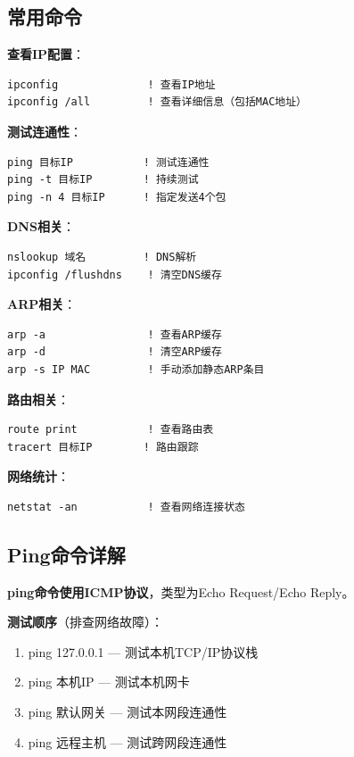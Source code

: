 \documentclass[12pt,a4paper]{ctexart}
\begin{document}
\subsection{常用命令}

\begin{cmdbox}
\textbf{查看IP配置}：
\begin{lstlisting}
ipconfig              ! 查看IP地址
ipconfig /all         ! 查看详细信息（包括MAC地址）
\end{lstlisting}

\textbf{测试连通性}：
\begin{lstlisting}
ping 目标IP           ! 测试连通性
ping -t 目标IP        ! 持续测试
ping -n 4 目标IP      ! 指定发送4个包
\end{lstlisting}

\textbf{DNS相关}：
\begin{lstlisting}
nslookup 域名         ! DNS解析
ipconfig /flushdns    ! 清空DNS缓存
\end{lstlisting}

\textbf{ARP相关}：
\begin{lstlisting}
arp -a                ! 查看ARP缓存
arp -d                ! 清空ARP缓存
arp -s IP MAC         ! 手动添加静态ARP条目
\end{lstlisting}

\textbf{路由相关}：
\begin{lstlisting}
route print           ! 查看路由表
tracert 目标IP        ! 路由跟踪
\end{lstlisting}

\textbf{网络统计}：
\begin{lstlisting}
netstat -an           ! 查看网络连接状态
\end{lstlisting}
\end{cmdbox}

\subsection{Ping命令详解}

\begin{keybox}
\textbf{ping命令使用ICMP协议}，类型为Echo Request/Echo Reply。

\textbf{测试顺序}（排查网络故障）：
\begin{enumerate}[itemsep=0pt]
    \item ping 127.0.0.1 — 测试本机TCP/IP协议栈
    \item ping 本机IP — 测试本机网卡
    \item ping 默认网关 — 测试本网段连通性
    \item ping 远程主机 — 测试跨网段连通性
\end{enumerate}
\end{keybox}
\end{document}
